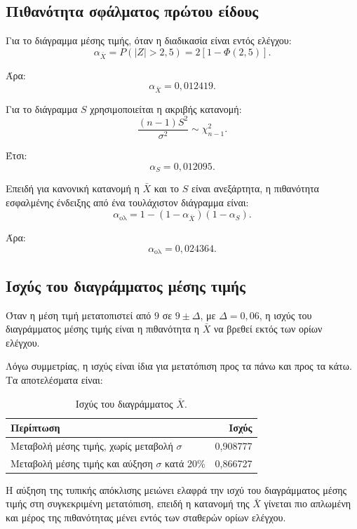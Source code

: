 \documentclass[12pt,a4paper]{article}
\begin{document}
\subsection{Πιθανότητα σφάλματος πρώτου είδους}

Για το διάγραμμα μέσης τιμής, όταν η διαδικασία είναι εντός ελέγχου:
\[
    \alpha_{\bar X}=P(|Z|>2{,}5)=2[1-\Phi(2{,}5)].
\]

Άρα:
\[
    \alpha_{\bar X}=0{,}012419.
\]

Για το διάγραμμα \(S\) χρησιμοποιείται η ακριβής κατανομή:
\[
    \frac{(n-1)S^2}{\sigma^2}\sim \chi^2_{n-1}.
\]

Έτσι:
\[
    \alpha_S=0{,}012095.
\]

Επειδή για κανονική κατανομή η \(\bar X\) και το \(S\) είναι ανεξάρτητα, η
πιθανότητα εσφαλμένης ένδειξης από ένα τουλάχιστον διάγραμμα είναι:
\[
    \alpha_{\text{ολ}}=
    1-(1-\alpha_{\bar X})(1-\alpha_S).
\]

Άρα:
\[
    \boxed{\alpha_{\text{ολ}}=0{,}024364}.
\]

\subsection{Ισχύς του διαγράμματος μέσης τιμής}

Όταν η μέση τιμή μετατοπιστεί από \(9\) σε \(9\pm\Delta\), με
\(\Delta=0{,}06\), η ισχύς του διαγράμματος μέσης τιμής είναι η πιθανότητα η
\(\bar X\) να βρεθεί εκτός των ορίων ελέγχου.

Λόγω συμμετρίας, η ισχύς είναι ίδια για μετατόπιση προς τα πάνω και προς τα
κάτω. Τα αποτελέσματα είναι:

\begin{table}[H]
\centering
\caption{Ισχύς του διαγράμματος \(\bar X\).}
\begin{tabular}{lr}
\toprule
\textbf{Περίπτωση} & \textbf{Ισχύς} \\
\midrule
Μεταβολή μέσης τιμής, χωρίς μεταβολή \(\sigma\) & 0,908777 \\
Μεταβολή μέσης τιμής και αύξηση \(\sigma\) κατά 20\% & 0,866727 \\
\bottomrule
\end{tabular}
\end{table}

Η αύξηση της τυπικής απόκλισης μειώνει ελαφρά την ισχύ του διαγράμματος μέσης
τιμής στη συγκεκριμένη μετατόπιση, επειδή η κατανομή της \(\bar X\) γίνεται
πιο απλωμένη και μέρος της πιθανότητας μένει εντός των σταθερών ορίων ελέγχου.
\end{document}
